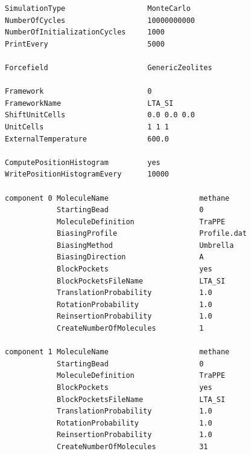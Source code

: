 \begin{tiny}
\begin{verbatim}
SimulationType                   MonteCarlo
NumberOfCycles                   10000000000
NumberOfInitializationCycles     1000
PrintEvery                       5000

Forcefield                       GenericZeolites

Framework                        0
FrameworkName                    LTA_SI
ShiftUnitCells                   0.0 0.0 0.0
UnitCells                        1 1 1
ExternalTemperature              600.0

ComputePositionHistogram         yes
WritePositionHistogramEvery      10000

component 0 MoleculeName                     methane
            StartingBead                     0
            MoleculeDefinition               TraPPE
            BiasingProfile                   Profile.dat
            BiasingMethod                    Umbrella
            BiasingDirection                 A
            BlockPockets                     yes
            BlockPocketsFileName             LTA_SI
            TranslationProbability           1.0
            RotationProbability              1.0
            ReinsertionProbability           1.0
            CreateNumberOfMolecules          1

component 1 MoleculeName                     methane
            StartingBead                     0
            MoleculeDefinition               TraPPE
            BlockPockets                     yes
            BlockPocketsFileName             LTA_SI
            TranslationProbability           1.0
            RotationProbability              1.0
            ReinsertionProbability           1.0
            CreateNumberOfMolecules          31
\end{verbatim}
\end{tiny}

